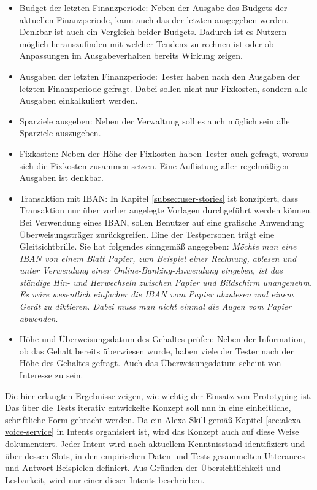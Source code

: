 \begin{itemize}
 \item Budget der letzten Finanzperiode: Neben der Ausgabe des Budgets der aktuellen Finanzperiode, kann auch das der letzten ausgegeben werden. Denkbar ist auch ein Vergleich beider Budgets. Dadurch ist es Nutzern möglich herauszufinden mit welcher Tendenz zu rechnen ist oder ob Anpassungen im Ausgabeverhalten bereits Wirkung zeigen.
 
 \item Ausgaben der letzten Finanzperiode: Tester haben nach den Ausgaben der letzten Finanzperiode gefragt. Dabei sollen nicht nur Fixkosten, sondern alle Ausgaben einkalkuliert werden.
 
 \item Sparziele ausgeben: Neben der Verwaltung soll es auch möglich sein alle Sparziele auszugeben.
 
 \item Fixkosten: Neben der Höhe der Fixkosten haben Tester auch gefragt, woraus sich die Fixkosten zusammen setzen. Eine Auflistung aller regelmäßigen Ausgaben ist denkbar.
 
 \item Transaktion mit IBAN: In Kapitel \ref{subsec:user-stories} ist konzipiert, dass Transaktion nur über vorher angelegte Vorlagen durchgeführt werden können. Bei Verwendung eines \ac{IBAN}, sollen Benutzer auf eine grafische Anwendung \bzw Überweisungsträger zurückgreifen. Eine der Testpersonen trägt eine Gleitsichtbrille. Sie hat folgendes sinngemäß angegeben: 
 \textit{Möchte man eine \ac{IBAN} von einem Blatt Papier, zum Beispiel einer Rechnung, ablesen und unter Verwendung einer Online-Banking-Anwendung eingeben, ist das ständige Hin- und Herwechseln zwischen Papier und Bildschirm unangenehm. Es wäre wesentlich einfacher die \ac{IBAN} vom Papier abzulesen und einem Gerät zu diktieren. Dabei muss man nicht einmal die Augen vom Papier abwenden}.
 
 \item Höhe und Überweisungsdatum des Gehaltes prüfen: Neben der Information, ob das Gehalt bereits überwiesen wurde, haben viele der Tester nach der Höhe des Gehaltes gefragt. Auch das Überweisungsdatum scheint von Interesse zu sein.
\end{itemize}

Die hier erlangten Ergebnisse zeigen, wie wichtig der Einsatz von Prototyping ist.\\
Das über die Tests iterativ entwickelte Konzept soll nun in eine einheitliche, schriftliche Form gebracht werden. Da ein Alexa Skill gemäß Kapitel \ref{sec:alexa-voice-service} in Intents organisiert ist, wird das Konzept auch auf diese Weise dokumentiert. Jeder Intent wird nach aktuellem Kenntnisstand identifiziert und über dessen Slots, in den empirischen Daten und Tests gesammelten Utterances und Antwort-Beispielen definiert. Aus Gründen der Übersichtlichkeit und Lesbarkeit, wird nur einer dieser Intents beschrieben.


